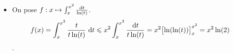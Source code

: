 \begin{itemize}
    \item On pose $f:x \mapsto \int_{x}^{x^2} \frac{\mathrm{d} t}{\ln (t)}$.
    $$\displaystyle f(x) = \int_{x}^{x^2} \frac{t}{t \ln (t)}\ \mathrm{d} t \leqslant x^2 \int_{x}^{x^2} \frac{\mathrm{d} t}{t \ln(t)} = x^2 \bigl[ \ln (\ln (t)) \bigr]_x^{x^2} = x^2 \ln(2)$$.
\end{itemize}